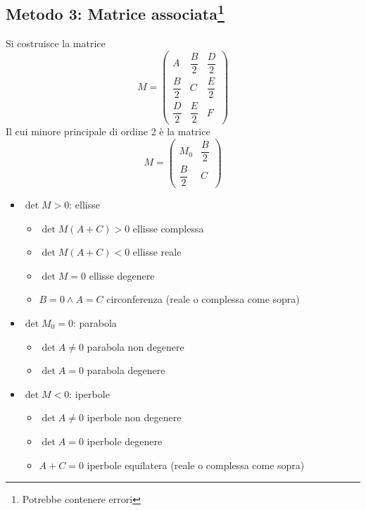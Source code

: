 \documentclass{article}
\begin{document}
\subsection*{Metodo 3: Matrice associata\footnote{Potrebbe contenere errori}}
Si costruisce la matrice \[\renewcommand{\arraystretch}{2}M=\begin{pmatrix}
    A & \dfrac{B}{2} & \dfrac{D}{2}\\
    \dfrac{B}{2} & C & \dfrac{E}{2} \\
    \dfrac{D}{2} & \dfrac{E}{2} & F
\end{pmatrix}\]
Il cui minore principale di ordine 2 è la matrice 
\[\renewcommand{\arraystretch}{2}M=\begin{pmatrix}
    M_0 & \dfrac{B}{2} \\
    \dfrac{B}{2} & C
\end{pmatrix}\]
\begin{itemize}
    \item $\det M>0$: ellisse
        \begin{itemize}
            \item $\det M(A+C)>0$ ellisse complessa
            \item $\det M(A+C)<0$ ellisse reale
            \item $\det M=0$ ellisse degenere
            \item $B=0 \land A=C$ circonferenza (reale o complessa come sopra)
        \end{itemize}
    \item $\det M_0=0$: parabola
        \begin{itemize}
            \item $\det A\neq 0$ parabola non degenere
            \item $\det A=0$ parabola degenere
        \end{itemize}
    \item $\det M<0$: iperbole
    \begin{itemize}
            \item $\det A\neq0$ iperbole non degenere
            \item $\det A=0$ iperbole degenere
            \item $A+C=0$ iperbole equilatera (reale o complessa come sopra)
        \end{itemize}
\end{itemize}
\end{document}

